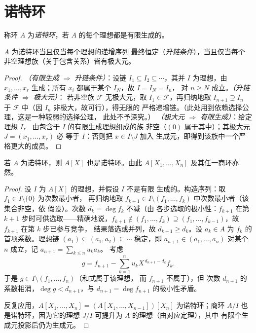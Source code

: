 \section{诺特环}

\begin{definition}\label{def:b3:rings:noetherian}
称环 $A$ 为\emph{诺特环}，若
$A$ 的每个理想都是有限生成的。
\end{definition}

\begin{proposition}\label{prop:b3:rings:noethacc}
$A$ 为诺特环当且仅当每个理想的递增序列
最终恒定（\emph{升链条件}），当且仅当每个
非空理想族（关于包含关系）皆有极大元。
\end{proposition}

\begin{proof}
\emph{（有限生成 $\Rightarrow$ 升链条件）}：设链 $I_1 \subseteq I_2
\subseteq \cdots$，其并 $I$ 为理想，由 $x_1,
\dots, x_r$ 生成；所有 $x_i$ 都属于某个 $I_N$，故 $I = I_N = I_n$，
对 $n \geq N$ 成立。\emph{（升链条件 $\Rightarrow$ 极大元）}：
若非空族 $\mathcal F$ 无极大元，取 $I_1 \in
\mathcal F$，再归纳地取 $I_{n+1} \supsetneq I_n$ 于
$\mathcal F$ 中（因 $I_n$ 非极大，故可行），得无限的
严格递增链。（此处用到依赖选择公理，这是一种较弱的选择公理，
此处不予深究。）
\emph{（极大元 $\Rightarrow$ 有限生成）}：给定理想 $I$，
由包含于 $I$ 的有限生成理想组成的族
非空（$(0)$ 属于其中）；其极大元 $J = (x_1, \dots, x_r)$ 必
等于 $I$：否则把 $x \in I \setminus J$ 加入
生成元，即得到该族中一个严格更大的成员。
\end{proof}

\begin{theorem}[希尔伯特基定理]\label{thm:b3:rings:hilbert}
若 $A$ 为诺特环，则 $A[X]$ 也是诺特环。由此 $A[X_1, \dots,
X_n]$ 及其任一商环亦然。
\end{theorem}

\begin{proof}
设 $I$ 为 $A[X]$ 的理想，并假设 $I$ 不是有限
生成的。构造序列：取 $f_1 \in I \setminus \{0\}$ 为次数最小者，
再归纳地取 $f_{k+1} \in I \setminus (f_1,
\dots, f_k)$ 中次数最小者（该集合非空，依
假设）。次数 $d_k = \deg f_k$ 不减（由
各步选取的极小性：$f_{k+1}$ 在第
$k+1$ 步时可供选取——精确地说，$f_{k+1} \notin (f_1,\dots,f_k) \supseteq
(f_1, \dots, f_{k-1})$，故 $f_{k+1}$ 在第 $k$ 步已参与竞争，
结果落选或并列，故 $d_{k+1} \geq d_k$。设 $a_k \in A$ 为
$f_k$ 的首项系数。理想链 $(a_1) \subseteq (a_1,
a_2) \subseteq \cdots$ 稳定，即 $a_{n+1} \in (a_1, \dots,
a_n)$ 对某个 $n$ 成立，记 $a_{n+1} = \sum_{k\leq n} u_k a_k$。
考虑
\[
g = f_{n+1} - \sum_{k=1}^{n} u_k X^{\,d_{n+1} - d_k} f_k .
\]
于是 $g \in I \setminus (f_1, \dots, f_n)$（和式属于该理想，
而 $f_{n+1}$ 不属于），但
次数 $d_{n+1}$ 的系数相消，$\deg g < d_{n+1}$，与
$d_{n+1} = \deg f_{n+1}$ 的极小性矛盾。

反复应用，$A[X_1, \dots, X_n] = (A[X_1, \dots, X_{n-1}])[X_n]$
为诺特环；商环 $A/I$ 也是诺特环，因为它的理想
$J/I$ 可提升为 $A$ 的理想（由对应定理），其中
有限个生成元投影后仍为生成元。
\end{proof}

